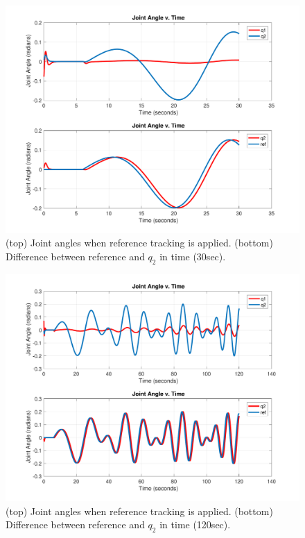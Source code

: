 \documentclass[12pt]{article}
\begin{document}
\begin{figure}[h!]
\centering
\includegraphics[width=1\textwidth]{RefTracking.pdf}
\caption{(top) Joint angles when reference tracking is applied. (bottom) Difference between reference and $q_{2}$ in time (30sec).}
\label{refref}
\end{figure}
\clearpage
\begin{figure}[h!]
\centering
\includegraphics[width=1\textwidth]{RefTracking2.pdf}
\caption{(top) Joint angles when reference tracking is applied. (bottom) Difference between reference and $q_{2}$ in time (120sec).}
\label{refref2}
\end{figure}
\clearpage
\end{document}
